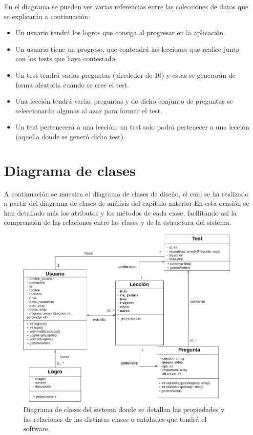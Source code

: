 En el diagrama se pueden ver varias referencias entre las colecciones de datos que se explicarán a continuación:
\begin{itemize}
    \item Un usuario tendrá los logros que consiga al progresar en la aplicación.
    \item Un usuario tiene un progreso, que contendrá las lecciones que realice junto con los tests que haya contestado.
    \item Un test tendrá varias preguntas (alrededor de 10) y estas se generarán de forma aleatoria cuando se cree el test.
    \item Una lección tendrá varias preguntas y de dicho conjunto de preguntas se seleccionarán algunas al azar para formar el test.
    \item Un test pertenecerá a una lección: un test solo podrá pertenecer a una lección (aquella donde se generó dicho test).
\end{itemize}

\section{Diagrama de clases}
A continuación se muestra el diagrama de clases de diseño, el cual se ha realizado a partir del diagrama de clases de análisis del capítulo anterior En esta ocasión se han detallado más
los atributos y los métodos de cada clase, facilitando así la comprensión de las relaciones entre las clases y de la estructura del sistema.
\begin{figure}[H]
    \centering
    \centerline{\includegraphics[width=\textwidth]{imagenes/c6/diagramadeclases.png}}
    \caption{Diagrama de clases del sistema donde se detallan las propiedades y las relaciones de las distintas clases o entidades que tendrá el software.}
    \label{fig:diagramadearquitectura}    
\end{figure}

